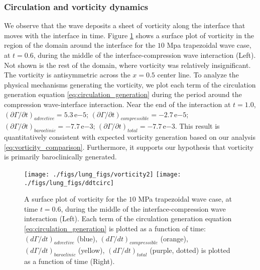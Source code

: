 \subsubsection{Circulation and vorticity dynamics}
We observe that the wave deposits a sheet of vorticity along the
interface that moves with the interface in time. Figure
\ref{fig:trapz_ddt_circ} shows a surface plot of vorticity in the
region of the domain around the interface for the $10$ Mpa trapezoidal
wave case, at $t=0.6$, during the middle of the interface-compression
wave interaction (Left). Not shown is the rest of the domain, where
vorticity was relatively insignificant. The vorticity is antisymmetric
across the $x=0.5$ center line. To analyze the physical mechanisms
generating the vorticity, we plot each term of the circulation
generation equation \eqref{eq:circulation_generation} during the
period around the compression wave-interface interaction. Near the end
of the interaction at $t=1.0$,
$\left(\partial \Gamma/\partial t\right)_{advective} =
5.3\,\text{e}{-5}$; %
$\left(\partial \Gamma/\partial t\right)_{compressible} =
-2.7\,\text{e}{-5}$; %
$\left(\partial \Gamma/\partial t\right)_{baroclinic} =
-7.7\,\text{e}{-3}$; %
$\left(\partial \Gamma/\partial t\right)_{total} =
-7.7\,\text{e}{-3}$. %
This result is quantitatively consistent with expected vorticity generation
based on our analysis \eqref{eq:vorticity_comparison}. Furthermore, it
supports our hypothesis that vorticity is primarily baroclinically
generated. 
%
\begin{figure}[h] 
  \centering
  \texttt{[image: ./figs/lung\_figs/vorticity2]}
  \texttt{[image: ./figs/lung\_figs/ddtcirc]}
  \caption[The vorticity field and individual contributions to circulation by physical mechanism]{A surface plot of vorticity for the $10$ MPa trapezoidal
    wave case, at time $t=0.6$, during the middle of the
    interface-compression wave interaction (Left). Each term of the
    circulation generation equation \eqref{eq:circulation_generation} is plotted as a function of time:
    $\left(d\Gamma/dt\right)_{advective}$ (blue),
    $\left(d\Gamma/dt\right)_{compressible}$ (orange),
    $\left(d\Gamma/dt\right)_{baroclinic}$ (yellow),
    $\left(d\Gamma/dt\right)_{total}$ (purple, dotted) is plotted as a
    function of time (Right).}
  \label{fig:trapz_ddt_circ}
\end{figure}
%
